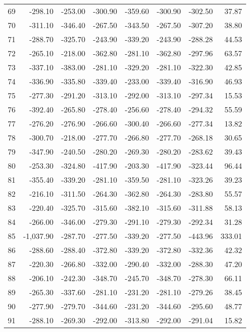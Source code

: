 \begin{longtable}{rrrrrrrr}
69 & -298.10 & -253.00 & -300.90 & -359.60 & -300.90 & -302.50 & 37.87  \\
70 & -311.10 & -346.40 & -267.50 & -343.50 & -267.50 & -307.20 & 38.80  \\
71 & -288.70 & -325.70 & -243.90 & -339.20 & -243.90 & -288.28 & 44.53  \\
72 & -265.10 & -218.00 & -362.80 & -281.10 & -362.80 & -297.96 & 63.57  \\
73 & -337.10 & -383.00 & -281.10 & -329.20 & -281.10 & -322.30 & 42.85  \\
74 & -336.90 & -335.80 & -339.40 & -233.00 & -339.40 & -316.90 & 46.93  \\
75 & -277.30 & -291.20 & -313.10 & -292.00 & -313.10 & -297.34 & 15.53  \\
76 & -392.40 & -265.80 & -278.40 & -256.60 & -278.40 & -294.32 & 55.59  \\
77 & -276.20 & -276.90 & -266.60 & -300.40 & -266.60 & -277.34 & 13.82  \\
78 & -300.70 & -218.00 & -277.70 & -266.80 & -277.70 & -268.18 & 30.65  \\
79 & -347.90 & -240.50 & -280.20 & -269.30 & -280.20 & -283.62 & 39.43  \\
80 & -253.30 & -324.80 & -417.90 & -203.30 & -417.90 & -323.44 & 96.44  \\
81 & -355.40 & -339.20 & -281.10 & -359.50 & -281.10 & -323.26 & 39.23  \\
82 & -216.10 & -311.50 & -264.30 & -362.80 & -264.30 & -283.80 & 55.57  \\
83 & -220.40 & -325.70 & -315.60 & -382.10 & -315.60 & -311.88 & 58.13  \\
84 & -266.00 & -346.00 & -279.30 & -291.10 & -279.30 & -292.34 & 31.28  \\
85 & -1,037.90 & -287.70 & -277.50 & -339.20 & -277.50 & -443.96 & 333.01  \\
86 & -288.60 & -288.40 & -372.80 & -339.20 & -372.80 & -332.36 & 42.32  \\
87 & -220.30 & -266.80 & -332.00 & -290.40 & -332.00 & -288.30 & 47.20  \\
88 & -206.10 & -242.30 & -348.70 & -245.70 & -348.70 & -278.30 & 66.11  \\
89 & -265.30 & -337.60 & -281.10 & -231.20 & -281.10 & -279.26 & 38.45  \\
90 & -277.90 & -279.70 & -344.60 & -231.20 & -344.60 & -295.60 & 48.77  \\
91 & -288.10 & -269.30 & -292.00 & -313.80 & -292.00 & -291.04 & 15.82  \\

\end{longtable}
